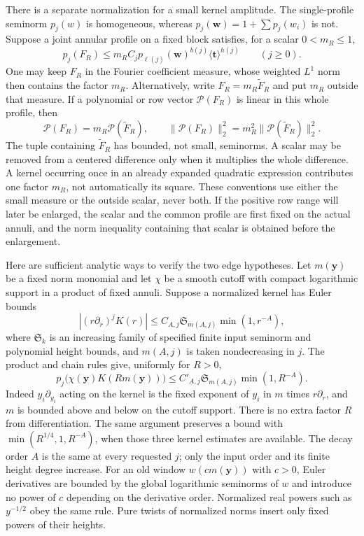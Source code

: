 \documentclass[11pt,a4paper]{article}
\numberwithin{equation}{section}
\numberwithin{figure}{section}
\theoremstyle{definition}
\theoremstyle{remark}
\begin{document}
There is a separate normalization for a small kernel amplitude.  The
single-profile seminorm $p_j(w)$ is homogeneous, whereas
$p_j(\boldsymbol w)=1+\sum p_j(w_i)$ is not.  Suppose a joint annular profile
on a fixed block satisfies, for a scalar $0<m_R\le1$,
\[
 p_j(F_R)\le m_R C_j p_{\ell(j)}(\boldsymbol w)^{b(j)}
                         \langle\boldsymbol t\rangle^{h(j)}
       \qquad(j\ge0).
\]
One may keep $F_R$ in the Fourier coefficient measure, whose weighted
$L^1$ norm then contains the factor $m_R$.  Alternatively, write
$F_R=m_R\widetilde F_R$ and put $m_R$ outside that measure.  If a polynomial
or row vector $\mathcal P(F_R)$ is linear in this whole profile, then
\[
 \mathcal P(F_R)=m_R\mathcal P(\widetilde F_R),\qquad
 \|\mathcal P(F_R)\|_2^2=m_R^2\|\mathcal P(\widetilde F_R)\|_2^2.
\]
The tuple containing $\widetilde F_R$ has bounded, not small, seminorms.
A scalar may be removed from a centered difference only when it multiplies
the whole difference.  A kernel occurring once in an already expanded
quadratic expression contributes one factor $m_R$, not automatically its
square.  These conventions use either the small measure or the outside
scalar, never both.  If the positive row range will later be enlarged, the
scalar and the common profile are first fixed on the actual annuli, and the
norm inequality containing that scalar is obtained before the enlargement.

Here are sufficient analytic ways to verify the two edge hypotheses.
Let $m(\boldsymbol y)$ be a fixed norm monomial and let $\chi$ be a smooth
cutoff with compact logarithmic support in a product of fixed annuli.
Suppose a normalized kernel has Euler bounds
\[
 |(r\partial_r)^jK(r)|\le C_{A,j}\mathfrak S_{m(A,j)}
                                      \min(1,r^{-A}),
\]
where $\mathfrak S_k$ is an increasing family of specified finite input
seminorm and polynomial height bounds, and $m(A,j)$ is taken nondecreasing
in $j$.  The product and chain rules give, uniformly for $R>0$,
\begin{equation}\label{eq:normalized-kernel-profile}
 p_j\bigl(\chi(\boldsymbol y)K(Rm(\boldsymbol y))\bigr)
 \le C'_{A,j}\mathfrak S_{m(A,j)}\min(1,R^{-A}).
\end{equation}
Indeed $y_i\partial_{y_i}$ acting on the kernel is the fixed exponent of
$y_i$ in $m$ times $r\partial_r$, and $m$ is bounded above and below on the
cutoff support.  There is no extra factor $R$ from differentiation.  The
same argument preserves a bound with
$\min(R^{1/4},1,R^{-A})$, when those three kernel estimates are available.
The decay order $A$ is the same at every requested $j$; only the input order
and its finite height degree increase.  For an old window
$w(c m(\boldsymbol y))$ with $c>0$, Euler derivatives are bounded by the
global logarithmic seminorms of $w$ and introduce no power of $c$ depending
on the derivative order.  Normalized real powers such as $y^{-1/2}$ obey the
same rule.  Pure twists of normalized norms insert only fixed powers of
their heights.
\end{document}
